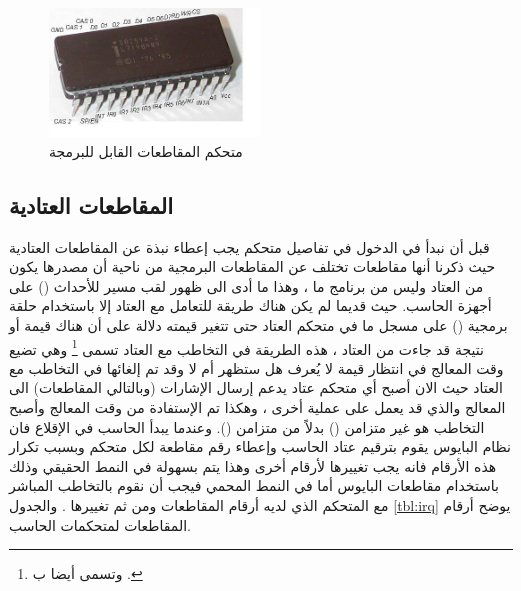 \documentclass[document.tex]{subfiles}
\begin{document}
\begin{figure}[h!]
  \label{fig:pic} 
  \caption{متحكم المقاطعات القابل للبرمجة }
  \centering
   \includegraphics[width=0.5\textwidth]{../img/Intel-D8259A}
\end{figure}


\subsection{المقاطعات العتادية }
قبل أن نبدأ في الدخول في تفاصيل متحكم  يجب إعطاء نبذة عن المقاطعات العتادية حيث ذكرنا أنها مقاطعات تختلف عن المقاطعات البرمجية من ناحية أن مصدرها يكون من العتاد وليس من برنامج ما ، وهذا ما أدى الى ظهور لقب مسير للأحداث () على أجهزة الحاسب. حيث قديما لم يكن هناك طريقة للتعامل مع العتاد إلا باستخدام حلقة برمجية () على مسجل ما في متحكم العتاد حتى تتغير قيمته دلالة على أن هناك قيمة أو نتيجة قد جاءت من العتاد ، هذه الطريقة في التخاطب مع العتاد تسمى \footnote{وتسمى أيضا ب .} وهي تضيع وقت المعالج في انتظار قيمة لا يُعرف هل ستظهر أم لا  وقد تم إلغائها في التخاطب مع العتاد حيث الان أصبح أي متحكم عتاد يدعم إرسال الإشارات (وبالتالي المقاطعات) الى المعالج والذي قد يعمل على عملية أخرى ، وهكذا تم الإستفادة من وقت المعالج وأصبح التخاطب هو غير متزامن () بدلاً من متزامن (). وعندما يبدأ الحاسب في الإقلاع فان نظام البايوس يقوم بترقيم عتاد الحاسب وإعطاء رقم مقاطعة لكل متحكم وبسبب تكرار هذه الأرقام فانه يجب تغييرها لأرقام أخرى وهذا يتم بسهولة في النمط الحقيقي وذلك باستخدام مقاطعات البايوس أما في النمط المحمي فيجب أن نقوم بالتخاطب المباشر مع المتحكم الذي لديه أرقام المقاطعات ومن ثم تغييرها . والجدول \ref{tbl:irq} يوضح أرقام المقاطعات لمتحكمات الحاسب.
\end{document}
